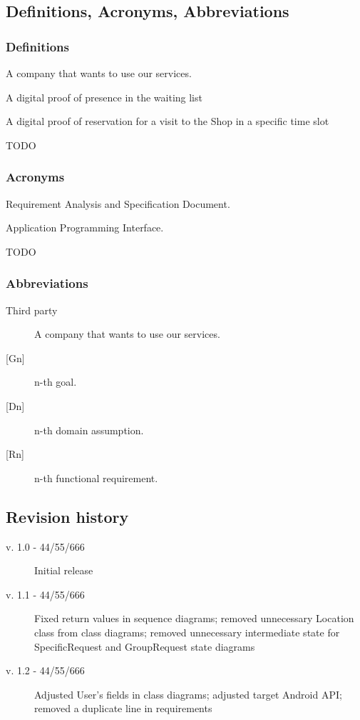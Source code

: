 \subsection{Definitions, Acronyms, Abbreviations}
\subsubsection{Definitions}
\begin{description}
    \item [Third party company] A company that wants to use our services.
    \item [Ticket] A digital proof of presence in the waiting list
    \item [Booking] A digital proof of reservation for a visit to the Shop in a specific time slot
    {\todo
        \item \huge TODO
    }
\end{description}
\subsubsection{Acronyms}
\begin{description}
    \item [RASD] Requirement Analysis and Specification Document. 
    \item [API] Application Programming Interface.
    {\todo
        \item \huge TODO
    }
\end{description}
\subsubsection{Abbreviations}
\begin{description}
    \item [Third party] A company that wants to use our services.
    \item [{[Gn]}] n-th goal. 
    \item [{[Dn]}] n-th domain assumption. 
    \item [{[Rn]}] n-th functional requirement. 
\end{description}

\subsection{Revision history}
{
\todo
\begin{description}
    \item[v. 1.0 - 44/55/666] Initial release
	\item[v. 1.1 - 44/55/666] Fixed return values in sequence diagrams; removed unnecessary Location class from class diagrams; removed unnecessary intermediate state for SpecificRequest and GroupRequest state diagrams
	\item[v. 1.2 - 44/55/666] Adjusted User's fields in class diagrams; adjusted target Android API; removed a duplicate line in requirements
\end{description}
}
